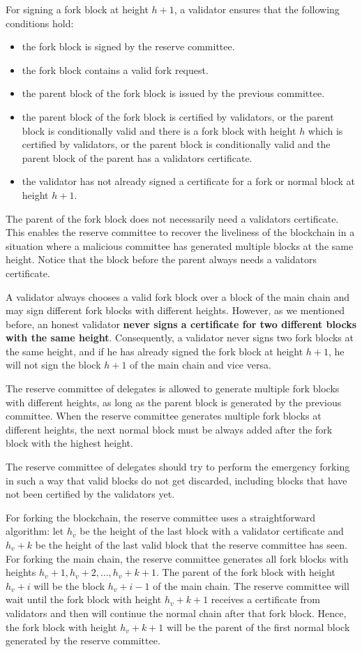 For signing a fork block at height $h+1$, a validator ensures that the following conditions hold:
\begin{itemize}
    \item the fork block is signed by the reserve committee.
    \item the fork block contains a valid fork request.
    \item the parent block of the fork block is issued by the previous committee.
    \item the parent block of the fork block is certified by validators, or the parent block is conditionally
    valid and there is a fork block with height $h$ which is certified by validators, or the parent block is
    conditionally valid and the parent block of the parent has a validators certificate.
    \item the validator has not already signed a certificate for a fork or normal block at height $h+1$.
\end{itemize}

The parent of the fork block does not necessarily need a validators certificate. This enables the
reserve committee to recover the liveliness of the blockchain in a situation where a malicious committee has
generated multiple blocks at the same height. Notice that the block before the parent always needs a validators
certificate.

A validator always chooses a valid fork block over a block of the main chain and may sign different fork
blocks with different heights. However, as we mentioned before, an honest validator
\textbf{never signs a certificate for two different blocks with the same height}. Consequently, a validator never
signs two fork blocks at the same height, and if he has already signed the fork block at height $h+1$, he will not
sign the block $h+1$ of the main chain and vice versa.

The reserve committee of delegates is allowed to generate multiple fork blocks with different heights, as long as the
parent block is generated by the previous committee. When the reserve committee generates multiple fork blocks
at different heights, the next normal block must be always added after the fork block with the highest height.

The reserve committee of delegates should try to perform the emergency forking in such a way that
valid blocks do not get discarded, including blocks that have not been certified by the validators yet.

For forking the blockchain, the reserve committee uses a straightforward algorithm: let $h_v$ be the height of the last
block with a validator certificate and $h_v+k$ be the height of the last valid block that the reserve committee has
seen. For forking the main chain, the reserve committee generates all fork blocks with heights $h_v+1,h_v+2,\dots,
h_v+k+1$. The parent of the fork block with height $h_v+i$ will be the block $h_v+i-1$ of the main chain. The
reserve committee will wait until the fork block with height $h_v+k+1$ receives a certificate from validators and
then will continue the normal chain after that fork block. Hence, the fork block with height $h_v+k+1$
will be the parent of the first normal block generated by the reserve committee.

